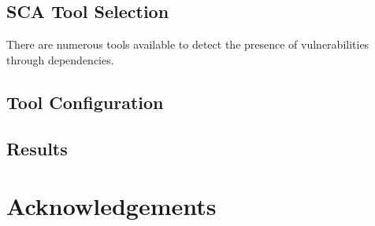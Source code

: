 \documentclass{article}
\begin{document}
\subsection{SCA Tool Selection}


There are numerous tools available to detect the presence of vulnerabilities through dependencies. 



\subsection{Tool Configuration}


\subsection{Results}

\section{Acknowledgements}




\end{document}
